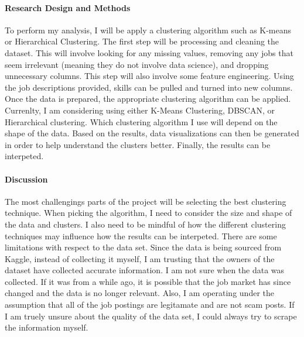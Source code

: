 \documentclass[12pt]{article}
\begin{document}
\paragraph{Research Design and Methods}

To perform my analysis, I will be apply a clustering algorithm such as K-means or Hierarchical Clustering. The first
step will be processing and cleaning the dataset. This will involve looking for any missing values, removing any jobs 
that seem irrelevant (meaning they do not involve data science), and dropping unnecessary columns. This step will also involve some 
feature engineering. Using the job descriptions provided, skills can be pulled and turned into new columns. Once the data is 
prepared, the appropriate clustering algorithm can be applied. Currenlty, I am considering using either K-Means Clustering, DBSCAN, or 
Hierarchical clustering. Which clustering algorithm I use will depend on the shape of the data. Based on the results, data 
visualizations can then be generated in order to help understand the clusters better. Finally, the results can be interpeted.

\paragraph{Discussion}


The most challengings parts of the project will be selecting the best clustering technique. When picking the algorithm, I need to 
consider the size and shape of the data and clusters. I also need to be mindful of how the different clustering techniques may
influence how the results can be interpeted. There are some limitations with respect to the data set. Since the data is being sourced 
from Kaggle, instead of collecting it myself, I am trusting that the owners of the dataset have collected accurate information. I am not 
sure when the data was collected. If it was from a while ago, it is possible that the job market has since changed and the data is no 
longer relevant. Also, I am operating under the assumption that all of the job postings are legitamate and are not scam posts. If I am 
truely unsure about the quality of the data set, I could always try to scrape the information myself.




\end{document}
